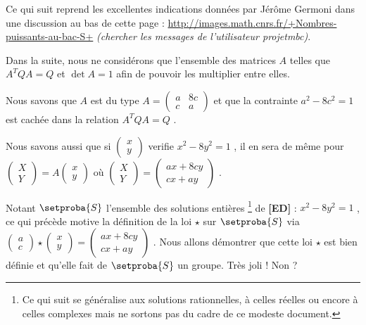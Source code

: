 Ce qui suit reprend les excellentes indications données par Jérôme Germoni dans une discussion au bas de cette page :
\url{http://images.math.cnrs.fr/+Nombres-puissants-au-bac-S+}
\textit{(chercher les messages de l'utilisateur projetmbc)}.


\bigskip

Dans la suite, nous ne considérons que l'ensemble des matrices $A$ telles que $A^T Q A = Q$ et $\det A = 1$ afin de pouvoir les multiplier entre elles.


\medskip

Nous savons que $A$ est du type 
$A
=
\begin{pmatrix} 
  a & 8c \\ 
  c & a
\end{pmatrix}$ 
et que la contrainte $a^2 - 8c^2 = 1$ est cachée dans la relation $A^T Q A = Q$ .


\medskip

Nous savons aussi que si
$\begin{pmatrix} 
  x \\ 
  y 
\end{pmatrix}$
verifie $x^2 - 8 y^2 = 1$ , il en sera de même pour
$\begin{pmatrix} 
  X \\ 
  Y 
\end{pmatrix}
=
A
\begin{pmatrix} 
  x \\ 
  y 
\end{pmatrix}$
où
$\begin{pmatrix} 
  X \\ 
  Y 
\end{pmatrix}
=
\begin{pmatrix} 
  a x + 8c y \\ 
  c x + a y
\end{pmatrix}$ .


\medskip

Notant $\setproba{S}$ l'ensemble des solutions entières
\footnote{
	Ce qui suit se généralise aux solutions rationnelles, à celles réelles ou encore à celles complexes mais ne sortons pas du cadre de ce modeste document.
}
de \textbf{[ED]} : $x^2 - 8 y^2 = 1$ , ce qui précède motive la définition de la loi $\star$ sur $\setproba{S}$ via
$\begin{pmatrix} 
  a \\ 
  c 
\end{pmatrix}
\star
\begin{pmatrix} 
  x \\ 
  y 
\end{pmatrix}
=
\begin{pmatrix} 
  a x + 8c y \\ 
  c x + a y
\end{pmatrix}$ .
Nous allons démontrer que cette loi $\star$ est bien définie et qu'elle fait de $\setproba{S}$ un groupe. Très joli ! Non ?


